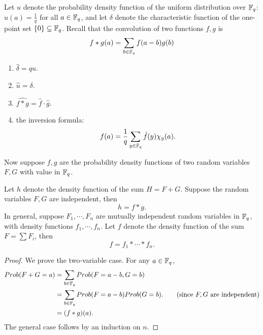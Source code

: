\documentclass{amsart}
\begin{document}
Let $u$ denote the probability density function of the uniform distribution over $\mathbb{F}_q$: $u(a) = \frac{1}{q}$ for all $a \in \mathbb{F}_q$, and let $\delta$ denote the characteristic function of the
one-point set $\{0\} \subseteq \mathbb{F}_q$. Recall that the convolution of two functions $f,g$ is
\[
    f  \ast g  (a) = \sum_{b \in \mathbb{F}_q} f(a-b)g(b)
\]
\begin{Fact} \label{fact: basicfourier}\qquad
\begin{enumerate}
\item $\hat{\delta} = qu$.

\item  $\hat{u} = \delta$.

\item $\widehat{f \ast g} = \hat{f} \cdot \hat{g}$.


\item the inversion formula:
\[
    f(a) = \frac{1}{q} \sum_{y \in \mathbb{F}_q} \hat{f}(y)\chi_y(a).
\]

\end{enumerate}
\end{Fact}

Now suppose $f,g$ are the probability density functions of two random variables $F,G$ with value in $\mathbb{F}_q$.

\begin{Lemma}
Let $h$ denote the density function of the sum $H =F+G$. Suppose the random variables $F,G$ are independent, then
\[
    h =  f \ast g.
\]
In general, suppose $F_1, \cdots, F_n$ are mutually independent random variables in $\mathbb{F}_q$, with density functions $f_1, \cdots, f_n$. Let $f$ denote the density function of the sum $F = \sum F_i$, then
\[
    f = f_1 \ast \cdots \ast f_n.
\]
\end{Lemma}

\begin{proof}
We prove the two-variable case. For any $a \in \mathbb{F}_q$,
\begin{align*}
Prob(F+G = a) &= \sum_{b \in \mathbb{F}_q} Prob(F = a-b, G =b) \\
& = \sum_{b \in \mathbb{F}_q} Prob(F = a-b)Prob(G =b).  \qquad \mbox{(since $F,G$ are independent)} \\
& = (f \ast g)(a).
\end{align*}
The general case follows by an induction on $n$.
\end{proof}
\end{document}

